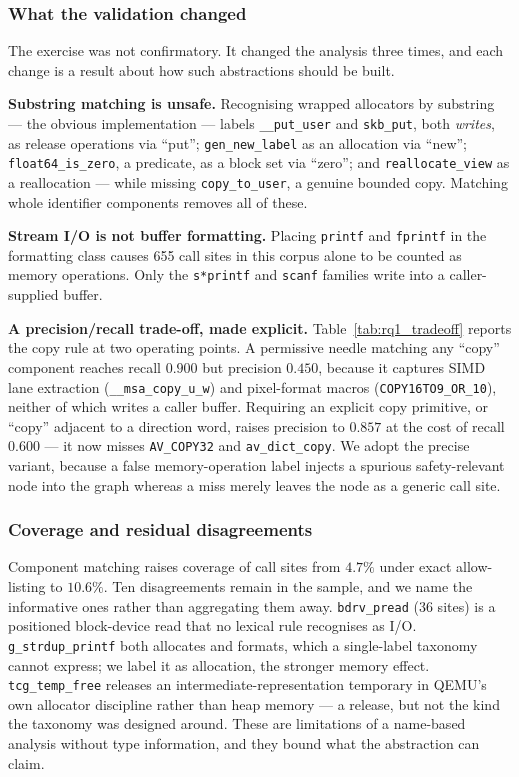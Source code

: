 

\subsubsection{What the validation changed}
The exercise was not confirmatory. It changed the analysis three times, and
each change is a result about how such abstractions should be built.

\textbf{Substring matching is unsafe.} Recognising wrapped allocators by
substring --- the obvious implementation --- labels \texttt{\_\_put\_user} and
\texttt{skb\_put}, both \emph{writes}, as release operations via ``put'';
\texttt{gen\_new\_label} as an allocation via ``new'';
\texttt{float64\_is\_zero}, a predicate, as a block set via ``zero''; and
\texttt{reallocate\_view} as a reallocation --- while missing
\texttt{copy\_to\_user}, a genuine bounded copy. Matching whole identifier
components removes all of these.

\textbf{Stream I/O is not buffer formatting.} Placing \texttt{printf} and
\texttt{fprintf} in the formatting class causes 655 call sites in this corpus
alone to be counted as memory operations. Only the \texttt{s*printf} and
\texttt{scanf} families write into a caller-supplied buffer.

\textbf{A precision/recall trade-off, made explicit.}
Table~\ref{tab:rq1_tradeoff} reports the copy rule at two operating points. A
permissive needle matching any ``copy'' component reaches recall $0.900$ but
precision $0.450$, because it captures SIMD lane extraction
(\texttt{\_\_msa\_copy\_u\_w}) and pixel-format macros
(\texttt{COPY16TO9\_OR\_10}), neither of which writes a caller buffer.
Requiring an explicit copy primitive, or ``copy'' adjacent to a direction word,
raises precision to $0.857$ at the cost of recall $0.600$ --- it now misses
\texttt{AV\_COPY32} and \texttt{av\_dict\_copy}. We adopt the precise variant,
because a false memory-operation label injects a spurious safety-relevant node
into the graph whereas a miss merely leaves the node as a generic call site.



\subsubsection{Coverage and residual disagreements}
Component matching raises coverage of call sites from $4.7\%$ under exact
allow-listing to $10.6\%$. Ten disagreements remain in the sample, and we name
the informative ones rather than aggregating them away. \texttt{bdrv\_pread}
(36 sites) is a positioned block-device read that no lexical rule recognises
as I/O. \texttt{g\_strdup\_printf} both allocates and formats, which a
single-label taxonomy cannot express; we label it as allocation, the stronger
memory effect. \texttt{tcg\_temp\_free} releases an intermediate-representation
temporary in QEMU's own allocator discipline rather than heap memory --- a
release, but not the kind the taxonomy was designed around. These are
limitations of a name-based analysis without type information, and they bound
what the abstraction can claim.

